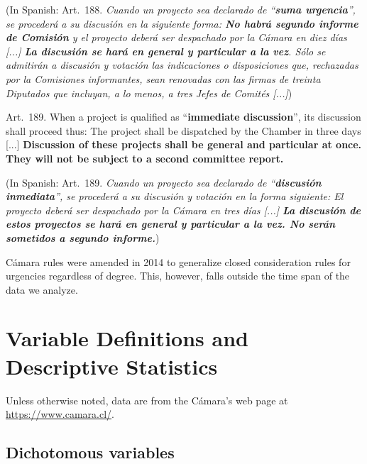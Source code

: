 \documentclass[letter,12pt]{article}
\begin{document}
(In Spanish: Art.~188. \emph{Cuando un proyecto sea declarado de ``\textbf{suma urgencia}'', se proceder\'a a su discusi\'on en la siguiente forma: \textbf{No habr\'a segundo informe de Comisi\'on} y el proyecto deber\'a ser despachado por la C\'amara en diez d\'ias [...]
\textbf{La discusi\'on se har\'a en general y particular a la vez}. S\'olo se admitir\'an a discusi\'on y votaci\'on las indicaciones o disposiciones que, rechazadas por la Comisiones informantes, sean renovadas con las firmas de treinta Diputados que incluyan, a lo menos, a tres Jefes de Comit\'es [...]})

\bigskip

Art.~189. When a project is qualified as ``\textbf{immediate discussion}'', its discussion shall proceed thus: The project shall be dispatched by the Chamber in three days [...]
\textbf{Discussion of these projects shall be general and particular at once. They will not be subject to a second committee report.}

(In Spanish: Art.~189. \emph{Cuando un proyecto sea declarado de ``\textbf{discusi\'on inmediata}'', se proceder\'a a su discusi\'on y votaci\'on en la forma siguiente:
El proyecto deber\'a ser despachado por la C\'amara en tres d\'ias [...]
\textbf{La discusi\'on de estos proyectos se har\'a en general y particular a la vez. No ser\'an sometidos a segundo informe.}})

\doublespacing

C\'amara rules were amended in 2014 to generalize closed consideration rules for urgencies regardless of degree. This, however, falls outside the time span of the data we analyze.


\section{Variable Definitions and Descriptive Statistics}

Unless otherwise noted, data are from the C\'amara's web page at \url{https://www.camara.cl/}.

\subsection{Dichotomous variables}\label{s:descriptives-dummies}
\end{document}
